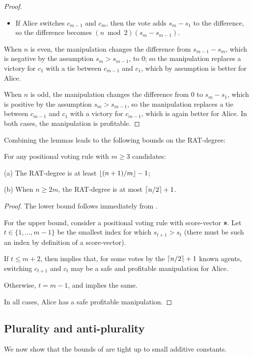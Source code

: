 \begin{proof}
\begin{itemize}
\item If Alice switches $c_{m-1}$ and $c_m$, then 
the vote adds $s_m - s_1$ to the difference, so the difference becomes $(n\bmod 2)(s_m - s_{m-1})$.
\end{itemize}
When $n$ is even, the manipulation changes the difference from $s_{m-1}-s_m$, which is negative by the assumption $s_m > s_{m-1}$, to $0$; so the manipulation replaces a victory for $c_1$ with a tie between $c_{m-1}$ and $c_1$, which by assumption is better for Alice.

When $n$ is odd, the manipulation changes the difference from $0$ to $s_{m}-s_1$, which is positive by the assumption $s_m > s_{m-1}$, so the manipulation replaces a tie between $c_{m-1}$ and $c_1$ with a victory for $c_{m-1}$, which is again better for Alice. In both cases, the manipulation is profitable.
\fi
\end{proof}


Combining the lemmas leads to the following bounds on the RAT-degree:
\begin{theorem}
\label{thm:positional-bounds}
For any positional voting rule with $m\geq 3$ candidates:

(a) The RAT-degree is at least $\left\lfloor (n+1)/m \right\rfloor-1$;

(b) When $n\geq 2m$, the RAT-degree is at most $\left\lceil n/2 \right\rceil+1$.
\end{theorem}
\begin{proof}
The lower bound follows immediately from .

For the upper bound, consider a positional voting rule with score-vector $\mathbf{s}$. Let $t \in \{1,\ldots,m-1\}$ be the smallest index for which $s_{t+1} > s_t$ (there must be such an index by definition of a score-vector).

If $t\leq m+2$, then  implies that, for some votes by the $\left\lceil n/2 \right\rceil+1$ known agents, switching $c_{t+1}$ and $c_t$ may be a safe and profitable manipulation for Alice.

Otherwise, $t=m-1$, and  implies the same.

In all cases, Alice has a safe profitable manipulation.
\end{proof}



\subsection{Plurality and anti-plurality}
We now show that the bounds of  are tight up to small additive constants.


